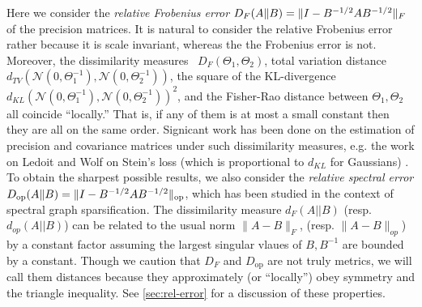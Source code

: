 \documentclass[aos]{imsart}
\theoremstyle{definition}
\numberwithin{equation}{section}
\DeclareMathOperator{\op}{op}
\DeclarePairedDelimiter{\norm}{\lVert}{\rVert}
\begin{document}
Here we consider the \emph{relative Frobenius error} $D_F(A \Vert B) = \norm{I - B^{-1/2} A B^{-1/2}}_F$ of the precision matrices. It is natural to consider the relative Frobenius error rather because it is scale invariant, whereas the the Frobenius error is not. Moreover, the dissimilarity measures ~$D_F(\Theta_1, \Theta_2)$, total variation distance $d_{TV}(\mathcal{N}(0, \Theta_1^{-1}), \mathcal{N}(0, \Theta_2^{-1}))$, the square of the KL-divergence $d_{KL}(\mathcal{N}(0, \Theta_1^{-1}), \mathcal{N}(0, \Theta_2^{-1}))^2$, and the Fisher-Rao distance between $\Theta_1, \Theta_2$ all coincide ``locally.'' That is, if any of them is at most a small constant then they are all on the same order. Signicant work has been done on the estimation of precision and covariance matrices under such dissimilarity measures, e.g. the work on Ledoit and Wolf on Stein's loss (which is proportional to $d_{KL}$ for Gaussians) \cite{ledoit2018optimal}. To obtain the sharpest possible results, we also consider the \emph{relative spectral error} $D_{\op}(A \Vert B) = \norm{I - B^{-1/2} A B^{-1/2}}_{\op}$, which has been studied in the context of spectral graph sparsification.
The dissimilarity measure $d_F(A||B)$ (resp. $d_{op}(A||B)$) can be related to the usual norm $\|A - B\|_F$, (resp. $\|A - B\|_{op}$) by a constant factor assuming the largest singular vlaues of $B, B^{-1}$ are bounded by a constant. Though we caution that $D_F$ and $D_{\op}$ are not truly metrics, we will call them distances because they approximately (or ``locally'') obey symmetry and the triangle inequality. See \cref{sec:rel-error} for a discussion of these properties.
\end{document}
